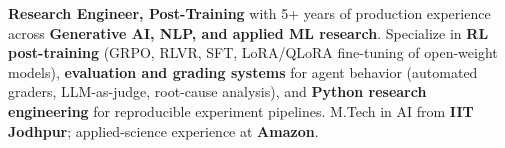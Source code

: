 \documentclass[letter,10pt]{article}
\begin{document}

\textbf{Research Engineer, Post-Training} with 5+ years of production experience across \textbf{Generative AI, NLP, and applied ML research}.
Specialize in \textbf{RL post-training} (GRPO, RLVR, SFT, LoRA/QLoRA fine-tuning of open-weight models), \textbf{evaluation and grading systems} for agent behavior (automated graders, LLM-as-judge, root-cause analysis), and \textbf{Python research engineering} for reproducible experiment pipelines.
M.Tech in AI from \textbf{IIT Jodhpur}; applied-science experience at \textbf{Amazon}.
\end{document}
